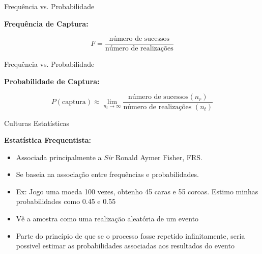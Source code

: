 \documentclass{beamer}\usepackage[]{graphicx}\usepackage[]{color}
\begin{document}
\begin{frame}{Frequência vs. Probabilidade}

\begin{centering}

\textbf{Frequência de Captura:}

\begin{equation*}
    F = \frac{\text{número de sucessos}}{\text{número de realizações}}
\end{equation*}


\end{centering}

\end{frame} 


\begin{frame}{Frequência vs. Probabilidade}

\begin{centering}

\textbf{Probabilidade de Captura:}

\begin{equation*}
    P(\text{captura}) \approx \lim_{n_t \to \infty} \frac{\text{número de sucessos} (n_r)}{\text{número de realizações } (n_t)}
\end{equation*}

\end{centering}

\end{frame} 

\begin{frame}{Culturas Estatísticas}

\textbf{Estatística Frequentista:}

\begin{itemize}

  \item Associada principalmente a \emph{Sir} Ronald Aymer Fisher, FRS.
\vfill
  \item Se baseia na associação entre frequências e probabilidades.
\vfill
  \item Ex: Jogo uma moeda 100 vezes, obtenho 45 caras e 55 coroas. Estimo minhas probabilidades como 0.45 e 0.55
\vfill
  \item Vê a amostra como uma realização aleatória de um evento
\vfill
  \item Parte do princípio de que se o processo fosse repetido infinitamente, seria possivel estimar as probabilidades associadas aos resultados do evento
  
\end{itemize}
 
\end{frame}
\end{document}
